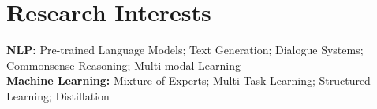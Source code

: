 \section{\mysidestyle Research Interests}
\vspace{0mm}
\textbf{NLP:} Pre-trained Language Models; Text Generation; Dialogue Systems; Commonsense Reasoning; Multi-modal Learning\\
\textbf{Machine Learning:} Mixture-of-Experts; Multi-Task Learning; Structured Learning; Distillation